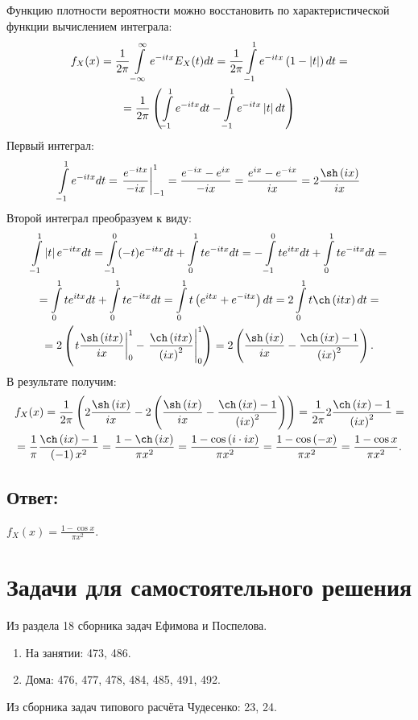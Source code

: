 Функцию плотности вероятности можно восстановить по характеристической функции вычислением интеграла:
\begin{multline}
    f_X(x)
    = \frac{1}{2 \pi} \int \limits_{-\infty}^\infty e^{-itx} E_X(t) dt
    = \frac{1}{2 \pi} \int \limits_{-1}^1 e^{-itx} \left ( 1 - \left | t \right | \right ) dt = \\
    = \frac{1}{2 \pi} \left ( \int \limits_{-1}^1 e^{-itx} dt - \int \limits_{-1}^1 e^{-itx} \left | t \right | dt \right )
\end{multline}
Первый интеграл:
\begin{equation}
    \int \limits_{-1}^1 e^{-itx} dt
    = \left . \frac{e^{-itx}}{-ix} \right |_{-1}^1
    = \frac{e^{-ix} - e^{ix}}{-ix}
    = \frac{e^{ix} - e^{-ix}}{ix}
    = 2 \frac{\sh \left ( ix \right )}{ix}
\end{equation}
Второй интеграл преобразуем к виду:
\begin{multline}
    \int \limits_{-1}^1 \modulus{t} e^{-itx} dt
    = \int \limits_{-1}^0 (-t) e^{-itx} dt + \int \limits_0^1 t e^{-itx} dt
    = - \int \limits_{-1}^0 t e^{itx} dt + \int \limits_0^1 t e^{-itx} dt = \\
    = \int \limits_0^1 t e^{itx} dt + \int \limits_0^1 t e^{-itx} dt
    = \int \limits_0^1 t \left ( e^{itx} + e^{-itx} \right ) dt
    = 2 \int \limits_0^1 t \ch \left ( itx \right ) dt = \\
    = 2 \left ( \left . t \frac{\sh \left ( itx \right )}{ix} \right |_0^1 - \left . \frac{\ch \left ( itx \right )}{\left ( ix \right )^2} \right |_0^1 \right )
    = 2 \left ( \frac{\sh \left ( ix \right )}{ix} - \frac{\ch \left ( ix \right ) - 1}{\left ( ix \right )^2} \right ) .
\end{multline}
В результате получим:
\begin{multline}
    f_X(x)
    = \frac{1}{2 \pi} \left ( 2 \frac{\sh \left ( ix \right )}{ix} - 2 \left ( \frac{\sh \left ( ix \right )}{ix} - \frac{\ch \left ( ix \right ) - 1}{\left ( ix \right )^2} \right ) \right )
    = \frac{1}{2 \pi} 2 \frac{\ch \left ( ix \right ) - 1}{\left ( ix \right )^2} = \\
    = \frac{1}{\pi} \frac{\ch \left ( ix \right ) - 1}{\left ( -1 \right ) x^2}
    = \frac{1 - \ch \left ( ix \right )}{\pi x^2}
    = \frac{1 - \cos \left ( i \cdot ix \right )}{\pi x^2}
    = \frac{1 - \cos \left ( -x \right )}{\pi x^2}
    = \frac{1 - \cos x}{\pi x^2} .
\end{multline}

\subsection*{Ответ:}
$f_X(x) = \frac{1 - \cos x}{\pi x^2}$.

\section*{Задачи для самостоятельного решения}

Из раздела 18 сборника задач Ефимова и Поспелова.
\begin{enumerate}
    \item На занятии: 473, 486.
    \item Дома: 476, 477, 478, 484, 485, 491, 492.
\end{enumerate}

Из сборника задач типового расчёта Чудесенко: 23, 24.